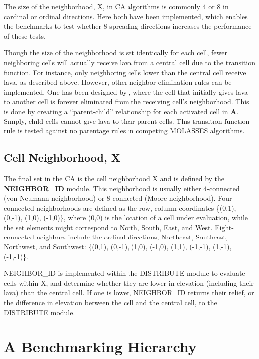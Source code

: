 \documentclass[12pt,letter]{article}
\begin{document}
		The size of the neighborhood, X, in CA algorithms is commonly 4 or 8 in cardinal or ordinal directions. Here both have been implemented, which enables the benchmarks to test whether 8 spreading directions increases the performance of these tests.

		Though the size of the neighborhood is set identically for each cell, fewer neighboring cells will actually receive lava from a central cell due to the transition function. For instance, only neighboring cells lower than the central cell receive lava, as described above. However, other neighbor elimination rules can be implemented. One has been designed by \citet{connor2012}, where the cell that initially gives lava to another cell is forever eliminated from the receiving cell's neighborhood. This is done by creating a ``parent-child'' relationship for each activated cell in \textbf{A}. Simply, child cells cannot give lava to their parent cells. This transition function rule is tested against no parentage rules in competing MOLASSES algorithms.
		
	\subsection{Cell Neighborhood, X}
		The final set in the CA is the cell neighborhood X and is defined by the \textbf{NEIGHBOR\_ID} module. This neighborhood is usually either 4-connected (von Neumann neighborhood) or 8-connected (Moore neighborhood). Four-connected neighborhoods are defined as the row, column coordinates \{(0,1), (0,-1), (1,0), (-1,0)\}, where (0,0) is the location of a cell under evaluation, while the set elements might correspond to North, South, East, and West. Eight-connected neighbors include the ordinal directions, Northeast, Southeast, Northwest, and Southwest: \{(0,1), (0,-1), (1,0), (-1,0), (1,1), (-1,-1), (1,-1), (-1,-1)\}.
		
		NEIGHBOR\_ID is implemented within the DISTRIBUTE module to evaluate cells within X, and determine whether they are lower in elevation (including their lava) than the central cell. If one is lower, NEIGHBOR\_ID returns their relief, or the difference in elevation between the cell and the central cell, to the DISTRIBUTE module.

			
			
			

	\section{A Benchmarking Hierarchy}\label{sec:benchmark}
	
\end{document}
